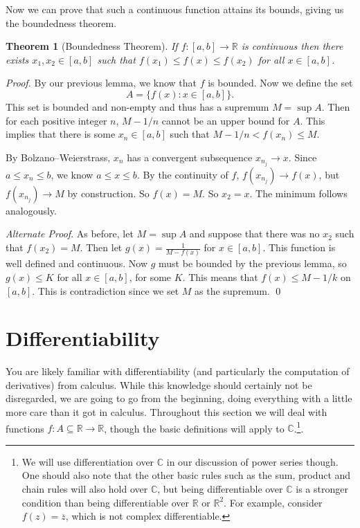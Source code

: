 \documentclass[11pt, a4paper]{article}
\newtheorem{theorem}{Theorem}[section]
\theoremstyle{definition}
\newcommand{\C}{\mathbb{C}}
\newcommand{\R}{\mathbb{R}}
\begin{document}
Now we can prove that such a continuous function attains its bounds, giving us the boundedness theorem.

\begin{theorem}[Boundedness Theorem]
	If $f:[a, b] \rightarrow \R$ is continuous then there exists $x_1, x_2 \in [a, b]$ such that $f(x_1) \leq f(x) \leq f(x_2)$ for all $x \in [a, b]$.
\end{theorem}
\begin{proof}
	By our previous lemma, we know that $f$ is bounded. Now we define the set
	$$
	A = \{f(x) : x \in [a, b]\}.
	$$
	This set is bounded and non-empty and thus has a supremum $M = \sup A$. Then for each positive integer $n$, $M - 1/n$ cannot be an upper bound for $A$. This implies that there is some $x_n \in [a, b]$ such that $M - 1/n < f(x_n) \leq M$.

	By Bolzano–Weierstrass, $x_n$ has a convergent subsequence $x_{n_j} \rightarrow x$. Since $a \leq x_n \leq b$, we know $a \leq x \leq b$. By the continuity of $f$, $f(x_{n_j}) \rightarrow f(x)$, but $f(x_{n_j}) \rightarrow M$ by construction. 
	So $f(x) = M$. So $x_2 = x$. The minimum follows analogously. \qedhere

	\emph{Alternate Proof}. As before, let $M = \sup A$ and suppose that there was no $x_2$ such that $f(x_2) = M$. Then let $g(x) = \frac{1}{M - f(x)}$ for $x \in [a, b]$. This function is well defined and continuous. Now $g$ must be bounded by the previous lemma, so $g(x) \leq K$ for all $x \in [a, b]$, for some $K$. This means that $f(x) \leq M - 1/k$ on $[a, b]$. This is contradiction since we set $M$ as the supremum. \hfill\qed
\end{proof}

\clearpage
\section{Differentiability}

You are likely familiar with differentiability (and particularly the computation of derivatives) from calculus. While this knowledge should certainly not be disregarded, we are going to go from the beginning, doing everything with a little more care than it got in calculus.
Throughout this section we will deal with functions $f: A \subseteq \R \rightarrow \R$,
though the basic definitions will apply to $\C$.\footnote{We will use differentiation over $\C$ in our discussion of power series though. One should also note that the other basic rules such as the sum, product and chain rules will also hold over $\C$, but being differentiable over $\C$ is a stronger condition than being differentiable over $\R$ or $\R^2$. For example, consider $f(z) = \overline{z}$, which is not complex differentiable.}.
\end{document}

